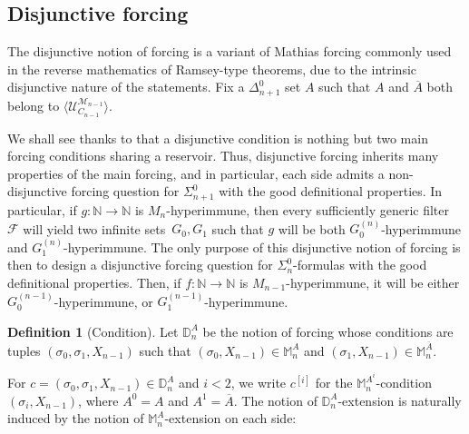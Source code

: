 \documentclass{article}
\def\NN{\mathbb{N}}
\def\DD{\mathbb{D}}
\def\MM{\mathbb{M}}
\def\F{\mathcal{F}}
\def\U{\mathcal{U}}
\def\M{\mathcal{M}}
\newcommand{\ludovic}[1]{\textcolor{blue}{#1}}
\numberwithin{theorem}{section}
\theoremstyle{definition}
\newtheorem{definition}[theorem]{Definition}
\begin{document}

\subsection{Disjunctive forcing}\label{sect:disjunctive-forcing}

The disjunctive notion of forcing is a variant of Mathias forcing commonly used in the reverse mathematics of Ramsey-type theorems, due to the intrinsic disjunctive nature of the statements. Fix a $\Delta^0_{n+1}$ set $A$ such that $A$ and $\overline{A}$ both belong to $\langle \U_{C_{n-1}}^{\M_{n-1}} \rangle$.

We shall see thanks to  that a disjunctive condition is nothing but two main forcing conditions sharing a reservoir. Thus, disjunctive forcing inherits many properties of the main forcing, and in particular, each side admits a non-disjunctive forcing question for $\Sigma^0_{n+1}$ with the good definitional properties. In particular, if $g : \NN \to \NN$ is $M_n$-hyperimmune, then every sufficiently generic filter~$\F$ will yield two infinite sets~$G_0, G_1$ such that $g$ will be both $G_0^{(n)}$-hyperimmune and $G_1^{(n)}$-hyperimmune. The only purpose of this disjunctive notion of forcing is then to design a disjunctive forcing question for $\Sigma^0_n$-formulas with the good definitional properties. Then, if $f : \NN \to \NN$ is $M_{n-1}$-hyperimmune, it will be either $G_0^{(n-1)}$-hyperimmune, or $G_1^{(n-1)}$-hyperimmune.

\begin{definition}[Condition]
Let $\DD_{n}^A$ be the notion of forcing whose conditions are tuples $(\sigma_0, \sigma_1, X_{n-1})$ such that $(\sigma_0, X_{n-1}) \in \MM_n^A$ and $(\sigma_1, X_{n-1}) \in \MM_n^{\overline{A}}$.
\end{definition}

For $c = (\sigma_0, \sigma_1, X_{n-1}) \in \DD_{n}^A$ and $i < 2$, we write $c^{[i]}$ for the $\MM_n^{A^i}$-condition $(\sigma_i, X_{n-1})$, where $A^0 = A$ and $A^1 = \overline{A}$. 
The notion of $\DD_{n}^A$-extension is naturally induced by the notion of $\MM^A_n$-extension on each side:
\end{document}

